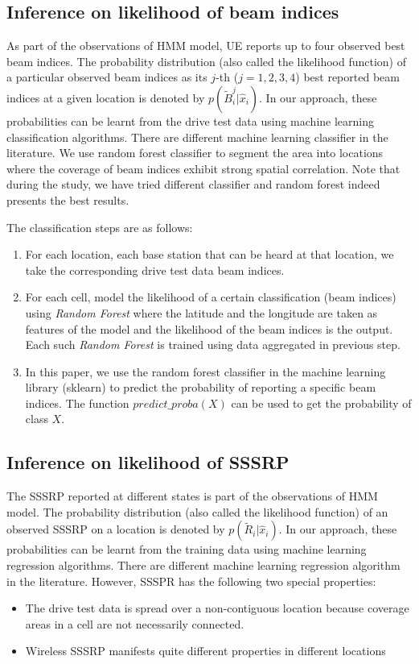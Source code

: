 \documentclass[conference, 10pt]{IEEEtran}
\begin{document}
\subsection{Inference on likelihood of beam indices}
\label{sec:prob-classification}
As part of the observations of HMM model, UE reports up to four observed best beam indices. The probability
distribution (also called the likelihood function) of a particular observed beam indices as its $j$-th ($j=1, 2, 3, 4$) best reported beam indices
at a given location is denoted by
$p(\tilde{B}^j_i|\hat{x}_{i})$. In our approach, these probabilities
can be learnt from the drive test data using machine learning classification algorithms.
There are different machine learning classifier in the literature. We use random forest classifier to segment the area into locations where the coverage of beam indices
exhibit strong spatial correlation. Note that during the study, we have tried different classifier and random forest indeed presents the best results.

The classification steps are as follows:

\begin{enumerate}

\item For each location, each base station that can be heard at that location, we
take the corresponding drive test data beam indices. 

\item For each cell, model the likelihood of a certain classification (beam indices) using {\em Random Forest} where the latitude and the longitude are 
taken as features of the model and the likelihood of the beam indices is the output. Each such {\em
Random Forest} is trained using data aggregated in previous step.

\item In this paper, we use the random forest classifier in the machine learning library (sklearn) to predict the probability of 
reporting a specific beam indices. The function $predict\_proba(X)$ can be used to get the probability of class $X$. 

\end{enumerate}
\subsection{Inference on likelihood of SSSRP}
\label{sec:prob-reg}
The SSSRP reported at different states
is part of the observations of HMM model. The probability
distribution (also called the likelihood function) of an observed SSSRP on a location is denoted by
$p(\tilde{R}_i|\hat{x}_{i})$. In our approach, these probabilities
can be learnt from the training data using machine learning regression algorithms. 
There are different machine learning regression algorithm in the literature.
However, SSSPR has the following two special properties:
\begin{itemize}
	\item The drive test data is spread over a non-contiguous location because coverage
	areas in a cell are not necessarily connected.
	\item  Wireless SSSRP manifests quite different properties in different locations
\end{itemize}
\end{document}
